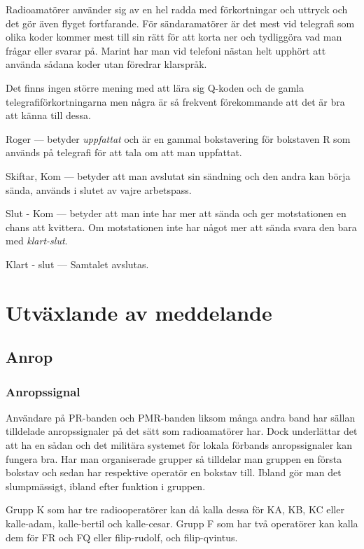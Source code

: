 Radioamatörer använder sig av en hel radda med förkortningar och uttryck och det gör även flyget fortfarande. För sändaramatörer är det mest vid telegrafi som olika koder kommer mest till sin rätt för att korta ner och tydliggöra vad man frågar eller svarar på. Marint har man vid telefoni nästan helt upphört att använda sådana koder utan föredrar klarspråk. 

Det finns ingen större mening med att lära sig Q-koden och de gamla telegrafiförkortningarna men några är så frekvent förekommande att det är bra att känna till dessa.

Roger --- betyder \textit{uppfattat} och är en gammal bokstavering för bokstaven R som används på telegrafi för att tala om att man uppfattat.

Skiftar, Kom --- betyder att man avslutat sin sändning och den andra kan börja sända, används i slutet av vajre arbetspass.

Slut - Kom --- betyder att man inte har mer att sända och ger motstationen en chans att kvittera. Om motstationen inte har något mer att sända svara den bara med \textit{klart-slut}.

Klart - slut --- Samtalet avslutas.


\section{Utväxlande av meddelande}

\subsection{Anrop}

\subsubsection{Anropssignal}

Användare på PR-banden och PMR-banden liksom många andra band har sällan tilldelade anropssignaler på det sätt som radioamatörer har. Dock underlättar det att ha en sådan och det militära systemet för lokala förbands anropssignaler kan fungera bra. Har man organiserade grupper så tilldelar man gruppen en första bokstav och sedan har respektive operatör en bokstav till. Ibland gör man det slumpmässigt, ibland efter funktion i gruppen.

Grupp K som har tre radiooperatörer kan då kalla dessa för KA, KB, KC eller kalle-adam, kalle-bertil och kalle-cesar. Grupp F som har två operatörer kan kalla dem för FR och FQ eller filip-rudolf, och filip-qvintus.

